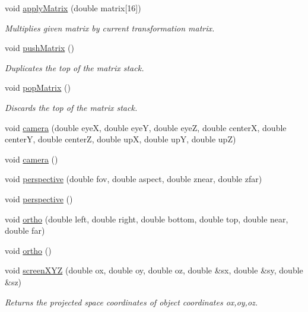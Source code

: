 \begin{DoxyCompactItemize}
void \hyperlink{namespacecprocessing_ab35dca9be506b14c4b7de3ac852d5761}{apply\-Matrix} (double matrix\mbox{[}16\mbox{]})
\begin{DoxyCompactList}\small\item\em \-Multiplies given matrix by current transformation matrix. \end{DoxyCompactList}\item 
void \hyperlink{namespacecprocessing_a0a8c81bb468438c6fd94d702738c94e7}{push\-Matrix} ()
\begin{DoxyCompactList}\small\item\em \-Duplicates the top of the matrix stack. \end{DoxyCompactList}\item 
void \hyperlink{namespacecprocessing_a447be31257a33fb4bb0e706e97f73637}{pop\-Matrix} ()
\begin{DoxyCompactList}\small\item\em \-Discards the top of the matrix stack. \end{DoxyCompactList}\item 
void \hyperlink{namespacecprocessing_a979315d19d15f5f9bea05e156a3e1ad6}{camera} (double eye\-X, double eye\-Y, double eye\-Z, double center\-X, double center\-Y, double center\-Z, double up\-X, double up\-Y, double up\-Z)
\item 
void \hyperlink{namespacecprocessing_a6c73262dc98cfd96fe88c0ad16a0453c}{camera} ()
\item 
void \hyperlink{namespacecprocessing_af457187b10c596fab7fe6a808a13309b}{perspective} (double fov, double aspect, double znear, double zfar)
\item 
void \hyperlink{namespacecprocessing_a49747e26d8bdc34c207db022abc208ab}{perspective} ()
\item 
void \hyperlink{namespacecprocessing_a565047eb5fbb68d456da93adabf1dcf2}{ortho} (double left, double right, double bottom, double top, double near, double far)
\item 
void \hyperlink{namespacecprocessing_a2f38b0b3a95c2a5a42eff8b20f337606}{ortho} ()
\item 
void \hyperlink{namespacecprocessing_a6240bce03ad9a42c8d943a716cac33be}{screen\-X\-Y\-Z} (double ox, double oy, double oz, double \&sx, double \&sy, double \&sz)
\begin{DoxyCompactList}\small\item\em \-Returns the projected space coordinates of object coordinates ox,oy,oz. \end{DoxyCompactList}\item 

\end{DoxyCompactItemize}

